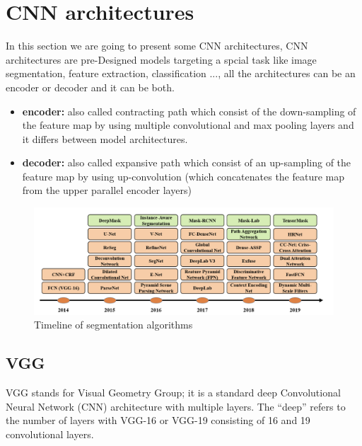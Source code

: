 \section{CNN architectures}
\vspace{0.2in}
\hspace{\parindent}
In this section we are going to present some CNN architectures, CNN architectures are pre-Designed models targeting a spcial task like image segmentation, feature extraction, classification ..., all the architectures can be an encoder or decoder and it can be both.
\begin{itemize}
    \item \textbf{encoder:} also called contracting path which consist of the down-sampling of the feature map by using multiple convolutional and max pooling layers and it differs between model architectures.
    \item \textbf{decoder:} also called expansive path which consist of an up-sampling of the feature map by using up-convolution (which concatenates the feature map from the upper parallel encoder layers)
\end{itemize}

\begin{figure}[h]
    \centering
      \vspace{-0.1in}
        \centerline{\includegraphics[width = 6in]{../images/timeline-of-segmentation-algorithms.png}}
        \caption{Timeline of segmentation algorithms}
    \end{figure}


\subsection{VGG}
\hspace{\parindent}
VGG stands for Visual Geometry Group; it is a standard deep Convolutional Neural Network (CNN) architecture with multiple layers. The “deep” refers to the number of layers with VGG-16 or VGG-19 consisting of 16 and 19 convolutional layers.\\

